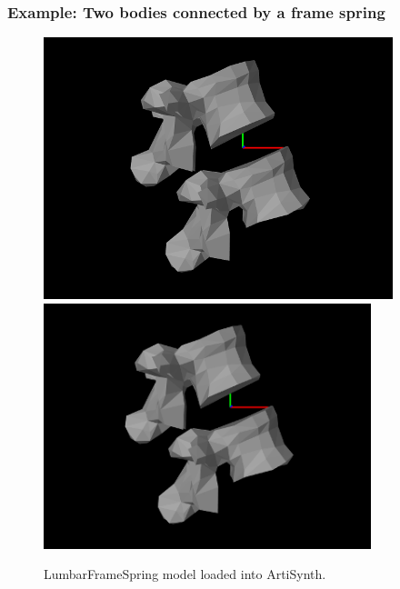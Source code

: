 \subsubsection{Example: Two bodies connected by a frame spring}

\begin{figure}[h]
\begin{center}
\iflatexml
 \includegraphics[]{images/LumbarFrameSpring}
\else
 \includegraphics[width=3.75in]{images/LumbarFrameSpring}
\fi
\end{center}
\caption{LumbarFrameSpring model loaded into ArtiSynth.}
\label{LumbarFrameSpring:fig}
\end{figure}

